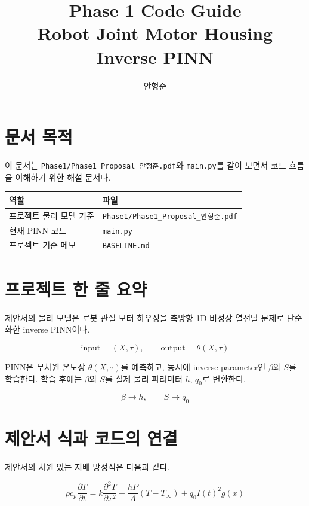 \documentclass[11pt]{article}
\title{Phase 1 Code Guide\\
\large Robot Joint Motor Housing Inverse PINN}
\author{안형준}
\date{}
\begin{document}
\maketitle

\section{문서 목적}

이 문서는 \texttt{Phase1/Phase1\_Proposal\_안형준.pdf}와 \texttt{main.py}를 같이 보면서 코드 흐름을 이해하기 위한 해설 문서다.

\begin{center}
\begin{tabular}{ll}
\toprule
역할 & 파일 \\
\midrule
프로젝트 물리 모델 기준 & \texttt{Phase1/Phase1\_Proposal\_안형준.pdf} \\
현재 PINN 코드 & \texttt{main.py} \\
프로젝트 기준 메모 & \texttt{BASELINE.md} \\
\bottomrule
\end{tabular}
\end{center}

\section{프로젝트 한 줄 요약}

제안서의 물리 모델은 로봇 관절 모터 하우징을 축방향 1D 비정상 열전달 문제로 단순화한 inverse PINN이다.

\[
\text{input} = (X,\tau), \qquad
\text{output} = \theta(X,\tau)
\]

PINN은 무차원 온도장 \(\theta(X,\tau)\)를 예측하고, 동시에 inverse parameter인 \(\beta\)와 \(S\)를 학습한다. 학습 후에는 \(\beta\)와 \(S\)를 실제 물리 파라미터 \(h\), \(q_0\)로 변환한다.

\[
\beta \rightarrow h, \qquad S \rightarrow q_0
\]

\section{제안서 식과 코드의 연결}

제안서의 차원 있는 지배 방정식은 다음과 같다.

\begin{equation}
\rho c_p \frac{\partial T}{\partial t}
=
k \frac{\partial^2 T}{\partial x^2}
-
\frac{hP}{A}(T - T_\infty)
+
q_0 I(t)^2 g(x)
\end{equation}
\end{document}
